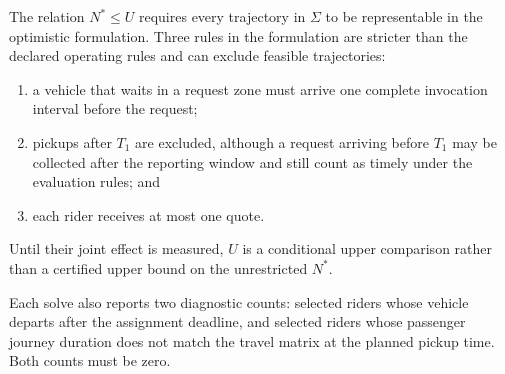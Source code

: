 The relation $N^*\leq U$ requires every trajectory in $\Sigma$ to be representable in the optimistic
formulation. Three rules in the formulation are stricter than the declared operating rules and can
exclude feasible trajectories:
\begin{enumerate}
  \item a vehicle that waits in a request zone must arrive one complete invocation interval before the
        request;
  \item pickups after $T_1$ are excluded, although a request arriving before $T_1$ may be collected
        after the reporting window and still count as timely under the evaluation rules; and
  \item each rider receives at most one quote.
\end{enumerate}
Until their joint effect is measured, $U$ is a conditional upper comparison rather than a certified
upper bound on the unrestricted $N^*$.

Each solve also reports two diagnostic counts: selected riders whose vehicle departs after the
assignment deadline, and selected riders whose passenger journey duration does not match the travel
matrix at the planned pickup time. Both counts must be zero.


